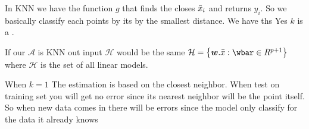 \documentclass[12pt]{article}
\begin{document}
\newpage


\begin{enumerate}


In KNN we have the function $g$ that finds the closes $\bar{x}_i$ and returns $y_i$. So we basically classify each points by its  by the smallest distance.
We have ths Yes $k$ is a . 


If our $\mathcal{A}$ is KNN out input $\mathcal{H}$ would be the same $\mathcal{H} = \braces{ \w. \xbar : \wbar \in  R^{p+1}}$ where $\mathcal{H}$ is the set of all linear models. 


When $k=1$ The estimation is based on the closest neighbor. When test on training set you will get no error since its nearest neighbor will be the point itself. So when new data comes in there will be errors since the model only classify for the data it already knows


\end{enumerate}

\end{document}
